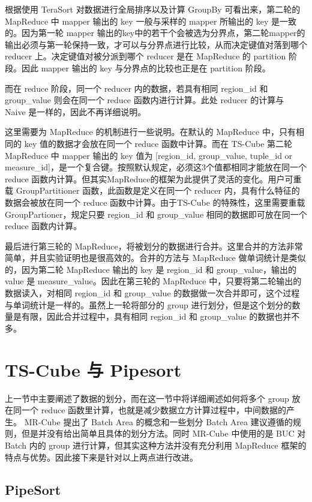 根据使用 TeraSort 对数据进行全局排序以及计算 GroupBy 可看出来，第二轮的 MapReduce 中 mapper 输出的 key 一般与采样的 mapper 所输出的 key 是一致的。因为第一轮 mapper 输出的key中的若干个会被选为分界点，第二轮mapper的输出必须与第一轮保持一致，才可以与分界点进行比较，从而决定键值对落到哪个 reducer 上。决定键值对被分派到哪个 reducer 是在 MapReduce 的 partition 阶段。因此 mapper 输出的 key 与分界点的比较也正是在 partition 阶段。

而在 reduce 阶段，同一个 reducer 内的数据，若具有相同 region\_id 和 group\_value 则会在同一个 reduce 函数内进行计算。此处 reducer 的计算与 Naive 是一样的，因此不再详细说明。


这里需要为 MapReduce 的机制进行一些说明。在默认的 MapReduce 中，只有相同的 key 值的数据才会放在同一个 reduce 函数中计算。而在 TS-Cube 第二轮 MapReduce 中 mapper 输出的 key 值为 [region\_id, group\_value, tuple\_id or measure\_id]，是一个复合键。按照默认规定，必须这3个值都相同才能放在同一个 reduce 函数内计算。但其实MapReduce的框架为此提供了灵活的变化。用户可重载 GroupPartitioner 函数，此函数是定义在同一个 reducer 内，具有什么特征的数据会被放在同一个 reduce 函数中计算。由于TS-Cube 的特殊性，这里需要重载 GroupPartioner，规定只要 region\_id 和 group\_value 相同的数据即可放在同一个 reduce 函数内计算。

最后进行第三轮的 MapReduce，将被划分的数据进行合并。这里合并的方法非常简单，并且实验证明也是很高效的。合并的方法与 MapReduce 做单词统计是类似的，因为第二轮 MapReduce 输出的 key 是 region\_id 和 group\_value，输出的 value 是 measure\_value。因此在第三轮的 MapReduce 中，只要将第二轮输出的数据读入，对相同 region\_id 和 group\_value 的数据做一次合并即可，这个过程与单词统计是一样的。虽然上一轮将部分的 group 进行划分，但是这个划分的数量是有限，因此合并过程中，具有相同 region\_id 和 group\_value 的数据也并不多。


\section{TS-Cube 与 Pipesort}

上一节中主要阐述了数据的划分，而在这一节中将详细阐述如何将多个 group 放在同一个 reduce 函数里计算，也就是减少数据立方计算过程中，中间数据的产生。 MR-Cube 提出了 Batch Area 的概念和一些划分 Batch Area 建议遵循的规则，但是并没有给出简单且具体的划分方法。同时 MR-Cube 中使用的是 BUC 对Batch 内的 group 进行计算，但其实这种方法并没有充分利用 MapReduce 框架的特点与优势。因此接下来是针对以上两点进行改进。


\subsection{PipeSort}


